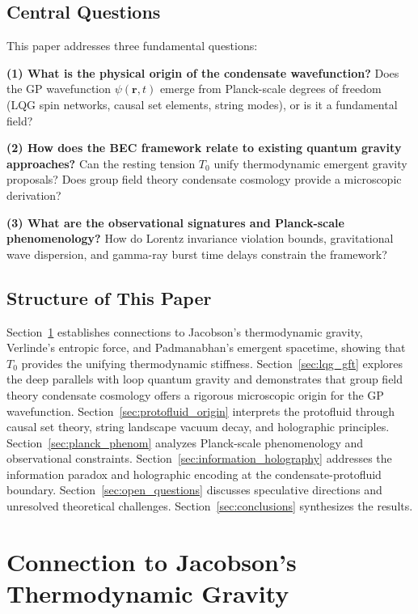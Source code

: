 \documentclass[11pt,a4paper]{article}
\newcommand{\Tzero}{\ensuremath{T_0}}
\theoremstyle{definition}
\theoremstyle{remark}
\begin{document}
\subsection{Central Questions}
\label{sec:central_questions}

This paper addresses three fundamental questions:

\textbf{(1) What is the physical origin of the condensate wavefunction?} Does the GP wavefunction $\psi(\mathbf{r},t)$ emerge from Planck-scale degrees of freedom (LQG spin networks, causal set elements, string modes), or is it a fundamental field?

\textbf{(2) How does the BEC framework relate to existing quantum gravity approaches?} Can the resting tension $\Tzero$ unify thermodynamic emergent gravity proposals? Does group field theory condensate cosmology provide a microscopic derivation?

\textbf{(3) What are the observational signatures and Planck-scale phenomenology?} How do Lorentz invariance violation bounds, gravitational wave dispersion, and gamma-ray burst time delays constrain the framework?

\subsection{Structure of This Paper}
\label{sec:structure}

Section~\ref{sec:jacobson} establishes connections to Jacobson's thermodynamic gravity, Verlinde's entropic force, and Padmanabhan's emergent spacetime, showing that $\Tzero$ provides the unifying thermodynamic stiffness. Section~\ref{sec:lqg_gft} explores the deep parallels with loop quantum gravity and demonstrates that group field theory condensate cosmology offers a rigorous microscopic origin for the GP wavefunction. Section~\ref{sec:protofluid_origin} interprets the protofluid through causal set theory, string landscape vacuum decay, and holographic principles. Section~\ref{sec:planck_phenom} analyzes Planck-scale phenomenology and observational constraints. Section~\ref{sec:information_holography} addresses the information paradox and holographic encoding at the condensate-protofluid boundary. Section~\ref{sec:open_questions} discusses speculative directions and unresolved theoretical challenges. Section~\ref{sec:conclusions} synthesizes the results.

\section{Connection to Jacobson's Thermodynamic Gravity}
\label{sec:jacobson}
\end{document}
